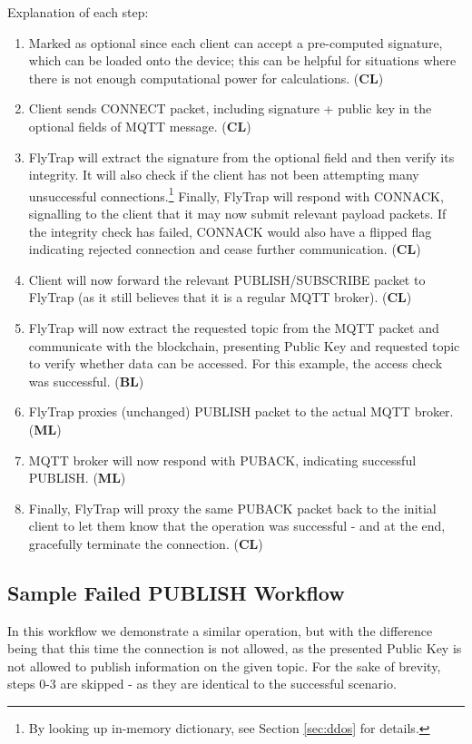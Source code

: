 Explanation of each step:
\begin{enumerate}\addtocounter{enumi}{-1}
    \item Marked as optional since each client can accept a pre-computed signature, which can be loaded onto the device; this can be helpful for situations where there is not enough computational power for calculations. (\textbf{CL})
    \item Client sends CONNECT packet, including signature + public key in the optional fields of MQTT message. (\textbf{CL})
    \item FlyTrap will extract the signature from the optional field and then verify its integrity. It will also check if the client has not been attempting many unsuccessful connections.\footnote{By looking up in-memory dictionary, see Section \ref{sec:ddos} for details.} Finally, FlyTrap will respond with CONNACK, signalling to the client that it may now submit relevant payload packets. If the integrity check has failed, CONNACK would also have a flipped flag indicating rejected connection and cease further communication. (\textbf{CL})
    \item Client will now forward the relevant PUBLISH/SUBSCRIBE packet to FlyTrap (as it still believes that it is a regular MQTT broker). (\textbf{CL})
    \item FlyTrap will now extract the requested topic from the MQTT packet and communicate with the blockchain, presenting Public Key and requested topic to verify whether data can be accessed. For this example, the access check was successful. (\textbf{BL})
    \item FlyTrap proxies (unchanged) PUBLISH packet to the actual MQTT broker. (\textbf{ML})
    \item MQTT broker will now respond with PUBACK, indicating successful PUBLISH. (\textbf{ML})
    \item Finally, FlyTrap will proxy the same PUBACK packet back to the initial client to let them know that the operation was successful - and at the end, gracefully terminate the connection. (\textbf{CL})
\end{enumerate}

\subsection{Sample Failed PUBLISH Workflow}
In this workflow we demonstrate a similar operation, but with the difference being that this time the connection is not allowed, as the presented Public Key is not allowed to publish information on the given topic. For the sake of brevity, steps 0-3 are skipped - as they are identical to the successful scenario.

